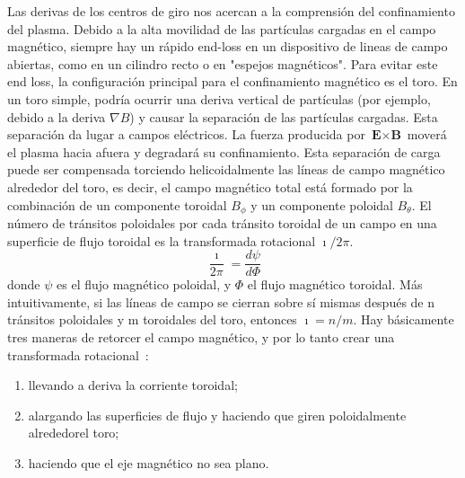 \par
Las derivas de los centros de giro nos acercan a la comprensión del confinamiento del plasma. 
Debido a la alta movilidad de las partículas cargadas en el campo magnético, siempre hay un 
rápido end-loss en un dispositivo de lineas de campo abiertas, como en un cilindro recto o en 
"espejos magnéticos". Para evitar este end loss, la configuración principal para el 
confinamiento magnético es el toro. En un toro simple, podría ocurrir una deriva vertical de 
partículas (por ejemplo, debido a la deriva $\nabla B$) y causar la separación de las partículas 
cargadas. Esta separación da lugar a campos eléctricos. 
La fuerza producida por $\textbf{E}\times\textbf{B}$ moverá el plasma hacia afuera y degradará su confinamiento. 
Esta separación de carga puede ser compensada torciendo helicoidalmente las líneas 
de campo magnético alrededor del toro, es decir, el campo magnético total está formado por 
la combinación de un componente toroidal $B_\phi$ y un componente poloidal $B_\theta$. El número de 
tránsitos poloidales por cada tránsito toroidal de un campo en una superficie de flujo toroidal 
es la transformada rotacional $\imath/2\pi$.
\begin{equation}\label{eq:transrot}
    \frac{\imath}{2\pi}=\frac{d\psi}{d\Phi}
\end{equation}
donde $\psi$ es el flujo magnético poloidal, y $\Phi$ el flujo magnético toroidal. Más intuitivamente, si
las líneas de campo se cierran sobre sí mismas después de n tránsitos poloidales y m 
toroidales del toro, entonces $\imath=n/m$.\newpage
Hay básicamente tres maneras de retorcer el campo magnético, y por lo tanto crear una transformada rotacional~\cite{Helander_2012}:
\begin{enumerate}[(1)]
    \item llevando a deriva la corriente toroidal;
    \item alargando las superficies de flujo y haciendo que giren poloidalmente alrededorel toro;
    \item haciendo que el eje magnético no sea plano.
\end{enumerate}
